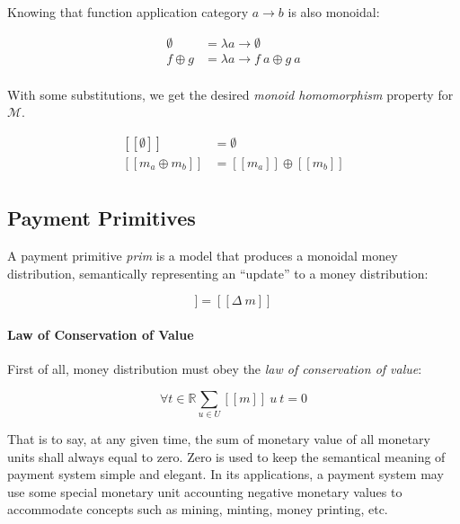 Knowing that function application category $a \rightarrow b$ is also monoidal:

\begin{equation}
    \begin{split}
        \emptyset &= \lambda a \rightarrow \emptyset \\
        f \oplus g &= \lambda a \rightarrow f\ a \oplus g\ a \\
    \end{split}
\end{equation}

With some substitutions, we get the desired \textit{monoid homomorphism} property for $\mathcal{M}$.

\begin{equation}
    \begin{split}
        [\![\emptyset]\!] &= \emptyset \\
        [\![m_a \oplus m_b]\!] &= [\![m_a]\!] \oplus [\![m_b]\!] \\
    \end{split}
\end{equation}

\subsection{Payment Primitives}

A payment primitive \textit{prim} is a model that produces a monoidal money distribution,
semantically representing an ``update'' to a money distribution:

\begin{equation}
    [\![prim]\!] = [\![\Delta\ m]\!]
\end{equation}

\paragraph{Law of Conservation of Value}

First of all, money distribution must obey the \textit{law of conservation of value}:

\begin{equation}
    \forall t \in \mathbb{R} {\displaystyle \sum_{u \in U} [\![m]\!]\ u\ t = 0}
\end{equation}

That is to say, at any given time, the sum of monetary value of all monetary units shall always
equal to zero. Zero is used to keep the semantical meaning of payment system simple and elegant. In
its applications, a payment system may use some special monetary unit accounting negative monetary
values to accommodate concepts such as mining, minting, money printing, etc.

